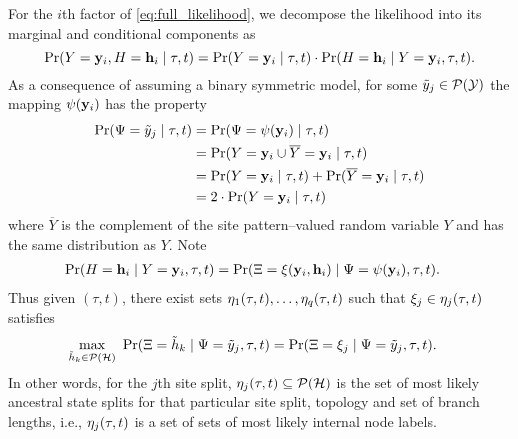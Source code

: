 For the $i$th factor of \eqref{eq:full_likelihood}, we decompose the likelihood into its marginal and conditional components as
\[
\Pr(Y=\mathbf{y}_i, H=\mathbf{h}_i \mid \tau, t) = \Pr(Y=\mathbf{y}_i \mid \tau, t) \cdot \Pr(H=\mathbf{h}_i \mid Y=\mathbf{y}_i, \tau, t).
\]
As a consequence of assuming a binary symmetric model, for some $\tilde{y}_j\in\mathcal{P}(\mathcal{Y})$ the mapping $\psi(\mathbf{y}_i)$ has the property
\begin{align*}
    \Pr(\Psi=\tilde{y}_j \mid \tau, t) &= \Pr(\Psi=\psi(\mathbf{y}_i) \mid \tau, t)\\
    &= \Pr(Y=\mathbf{y}_i \cup \overline{Y}=\mathbf{y}_i \mid \tau, t)\\
    &= \Pr(Y=\mathbf{y}_i \mid \tau, t) + \Pr(\overline{Y}=\mathbf{y}_i \mid \tau, t)\\
    &= 2\cdot\Pr(Y=\mathbf{y}_i \mid \tau, t)
\end{align*}
where $\overline{Y}$ is the complement of the site pattern--valued random variable $Y$ and has the same distribution as $Y$.
Note
\begin{align*}
    \Pr(H=\mathbf{h}_i \mid Y=\mathbf{y}_i, \tau, t) &= \Pr(\Xi=\xi(\mathbf{y}_i, \mathbf{h}_i) \mid \Psi=\psi(\mathbf{y}_i), \tau, t).
\end{align*}
Thus given $(\tau, t)$, there exist sets $\eta_1(\tau, t),\ldots,\eta_q(\tau, t)$ such that $\xi_j\in\eta_j(\tau, t)$ satisfies
\begin{align*}
\max_{\ancestralSplit_k\in\mathcal{P}(\ancestralSplitSet)} \ \Pr(\ancestralSplitRV=\ancestralSplit_k \mid \siteSplitRV=\siteSplit_j, \tau, t) &= \Pr(\ancestralSplitRV = \xi_j \mid \siteSplitRV=\siteSplit_j, \tau, t).
\end{align*}
In other words, for the $j$th site split, $\eta_j(\tau, t)\subseteq\mathcal{P}(\mathcal{H})$ is the set of most likely ancestral state splits for that particular site split, topology and set of branch lengths, i.e., $\eta_j(\tau, t)$ is a set of sets of most likely internal node labels.
